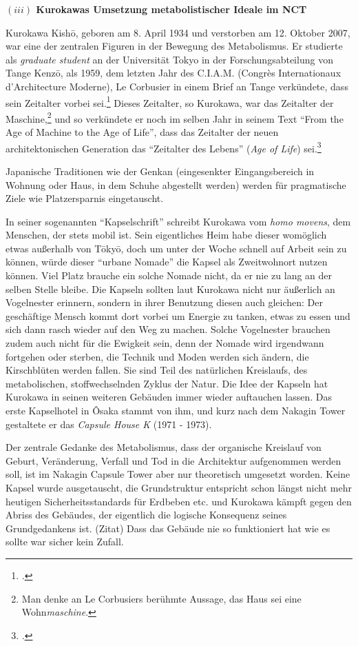 \documentclass[a4paper, 12pt]{article}
\begin{document}
\begin{onehalfspace}
\vspace{5mm}
\noindent\textbf{$(iii)$ Kurokawas Umsetzung metabolistischer Ideale im NCT}

\noindent Kurokawa Kishō, geboren am 8. April 1934 und verstorben am 12. Oktober 2007, war eine der zentralen Figuren in der Bewegung des Metabolismus. Er studierte als \emph{graduate student} an der Universität Tokyo in der Forschungsabteilung von Tange Kenzō, als 1959, dem letzten Jahr des C.I.A.M. (Congrès Internationaux d'Architecture Moderne), Le Corbusier in einem Brief an Tange verkündete, dass sein Zeitalter vorbei sei.\footnote{\Cite[Siehe][S. 2]{agekuro}.} Dieses Zeitalter, so Kurokawa, war das Zeitalter der Maschine,\footnote{Man denke an Le Corbusiers berühmte Aussage, das Haus sei eine Wohn\emph{maschine}.} und so verkündete er noch im selben Jahr in seinem Text "`From the Age of Machine to the Age of Life"', dass das Zeitalter der neuen architektonischen Generation das "`Zeitalter des Lebens"' (\emph{Age of Life}) sei.\footnote{\Cite[Siehe][S. 3]{agekuro}.} 

Japanische Traditionen wie der Genkan (eingesenkter Eingangsbereich in Wohnung oder Haus, in dem Schuhe abgestellt werden) werden für pragmatische Ziele wie Platzersparnis eingetauscht. 

In seiner sogenannten "`Kapselschrift"' schreibt Kurokawa vom \emph{homo movens}, dem Menschen, der stets mobil ist. Sein eigentliches Heim habe dieser womöglich etwas außerhalb von Tōkyō, doch um unter der Woche schnell auf Arbeit sein zu können, würde dieser "`urbane Nomade"' die Kapsel als Zweitwohnort nutzen können. Viel Platz brauche ein solche Nomade nicht, da er nie zu lang an der selben Stelle bleibe. Die Kapseln sollten laut Kurokawa nicht nur äußerlich an Vogelnester erinnern, sondern in ihrer Benutzung diesen auch gleichen: Der geschäftige Mensch kommt dort vorbei um Energie zu tanken, etwas zu essen und sich dann rasch wieder auf den Weg zu machen. Solche Vogelnester brauchen zudem auch nicht für die Ewigkeit sein, denn der Nomade wird irgendwann fortgehen oder sterben, die Technik und Moden werden sich ändern, die Kirschblüten werden fallen. Sie sind Teil des natürlichen Kreislaufs, des metabolischen, stoffwechselnden Zyklus der Natur. Die Idee der Kapseln hat Kurokawa in seinen weiteren Gebäuden immer wieder auftauchen lassen. Das erste Kapselhotel in Ôsaka stammt von ihm, und kurz nach dem Nakagin Tower gestaltete er das \emph{Capsule House K} (1971 - 1973). 


Der zentrale Gedanke des Metabolismus, dass der organische Kreislauf von Geburt, Veränderung, Verfall und Tod in die Architektur aufgenommen werden soll, ist im Nakagin Capsule Tower aber nur theoretisch umgesetzt worden. Keine Kapsel wurde ausgetauscht, die Grundstruktur entspricht schon längst nicht mehr heutigen Sicherheitsstandards für Erdbeben etc. und Kurokawa kämpft gegen den Abriss des Gebäudes, der eigentlich die logische Konsequenz seines Grundgedankens ist. (Zitat) Dass das Gebäude nie so funktioniert hat wie es sollte war sicher kein Zufall.


\end{onehalfspace}
\end{document}
